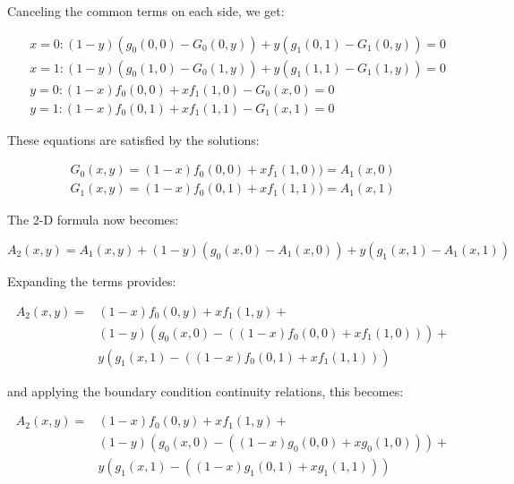 \documentclass{article}
\begin{document}
Canceling the common terms on each side, we get:

\begin{equation}
\begin{split}
  &x=0: (1-y)(g_0(0,0) - G_0(0,y)) + y(g_1(0,1) - G_1(0,y)) = 0 \\
  &x=1: (1-y)(g_0(1,0) - G_0(1,y)) + y(g_1(1,1) - G_1(1,y)) = 0 \\
  &y=0: (1-x)f_0(0,0) + xf_1(1,0) - G_0(x,0) = 0 \\
  &y=1: (1-x)f_0(0,1) + xf_1(1,1) - G_1(x,1) = 0
\end{split}
\end{equation}

These equations are satisfied by the solutions:

\begin{equation}
\begin{split}
  G_0(x,y) = (1-x)f_0(0,0) + xf_1(1,0)) = A_1(x,0) \\
  G_1(x,y) = (1-x)f_0(0,1) + xf_1(1,1)) = A_1(x,1)
\end{split}
\end{equation}

The 2-D formula now becomes:

\begin{equation}
  A_2(x,y) = A_1(x,y) + (1-y)(g_0(x,0) - A_1(x,0)) + y(g_1(x,1) - A_1(x,1))
\end{equation}

Expanding the terms provides:

\begin{equation}
\begin{split}
  A_2(x,y) = &(1-x)f_0(0,y) + xf_1(1,y) + \\
  &(1-y)(g_0(x,0) - ((1-x)f_0(0,0) + xf_1(1,0))) + \\
  &y(g_1(x,1) - ((1-x)f_0(0,1) + xf_1(1,1)))
\end{split}
\end{equation}

\noindent and applying the boundary condition continuity relations, this becomes:

\begin{equation}
\begin{split}
  A_2(x,y) = &(1-x)f_0(0,y) + xf_1(1,y) + \\
  &(1-y)(g_0(x,0) - ((1-x)g_0(0,0) + xg_0(1,0))) + \\
  &y(g_1(x,1) - ((1-x)g_1(0,1) + xg_1(1,1)))
\end{split}
\end{equation}
\end{document}

